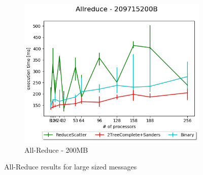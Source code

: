 \documentclass[sigplan,review,anonymous]{acmart}\settopmatter{printfolios=true,printccs=false,printacmref=false}
\begin{document}
\begin{figure}
\begin{subfigure}{0.5\textwidth}
  \centering
  \includegraphics[width=0.5\linewidth]{images/Results/AllReduce/AllReduceComp2_209715200B.png}
  \caption{All-Reduce - 200MB}
  \label{reduce-selected-7MB}
\end{subfigure}
\caption{All-Reduce results for large sized messages}
\label{graph-reduce-medium2-selected}
\end{figure}



\end{document}
